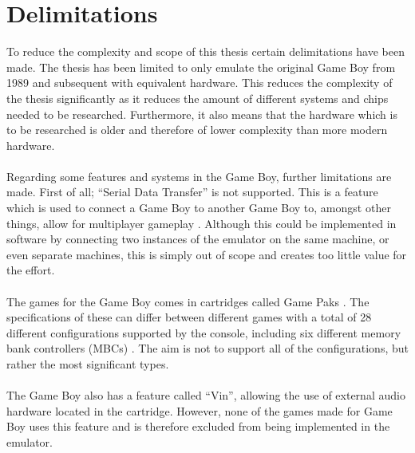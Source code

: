 \section{Delimitations}
\label{sec:Delimitations}
To reduce the complexity and scope of this thesis certain delimitations have been made.
The thesis has been limited to only emulate the original Game Boy from 1989 and subsequent with equivalent hardware. This reduces the complexity of the thesis significantly as it reduces the amount of different systems and chips needed to be researched. Furthermore, it also means that the hardware which is to be researched is older and therefore of lower complexity than more modern hardware.
\\\\
Regarding some features and systems in the Game Boy, further limitations are made. First of all; ``Serial Data Transfer'' is not supported. This is a feature which is used to connect a Game Boy to another Game Boy to, amongst other things, allow for multiplayer gameplay \cite{GBWikiSerialDataTransferTutorial}. Although this could be implemented in software by connecting two instances of the emulator on the same machine, or even separate machines, this is simply out of scope and creates too little value for the effort.
\\\\
The games for the Game Boy comes in cartridges called Game Paks \cite{gamepak}. The specifications of these can differ between different games with a total of 28 different configurations supported by the console, including six different memory bank controllers (MBCs) \cite{cartridgeType}. The aim is not to support all of the configurations, but rather the most significant types. \\\\
The Game Boy also has a feature called ``Vin'', allowing the use of external audio hardware located in the cartridge. However, none of the games made for Game Boy uses this feature \cite{pandDocsSoundControlRegisters} and is therefore excluded from being implemented in the emulator.

